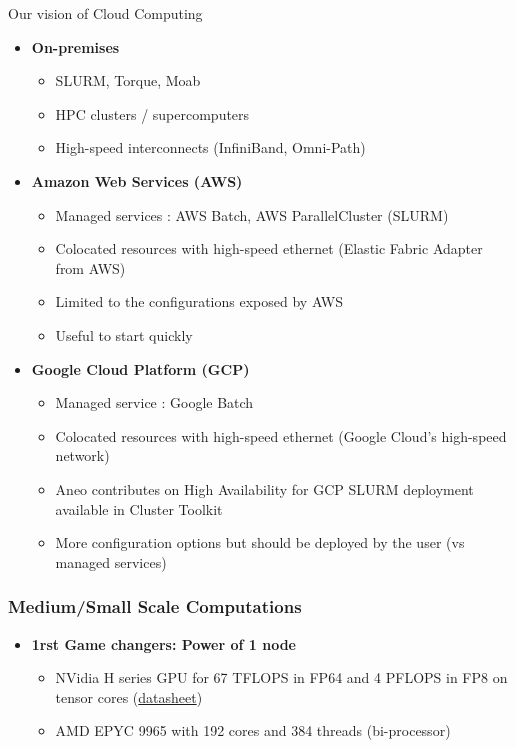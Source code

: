 \documentclass[10pt,aspectratio=1609]{beamer}
\begin{document}
\begin{section}{Our vision of Cloud Computing}
\begin{frame}
  \begin{itemize}
    \item \textbf{On-premises}
    \begin{itemize}
      \item SLURM, Torque, Moab
      \item HPC clusters / supercomputers
      \item High-speed interconnects (InfiniBand, Omni-Path)
    \end{itemize}

    \item \textbf{Amazon Web Services (AWS)}
    \begin{itemize}
      \item Managed services : AWS Batch, AWS ParallelCluster (SLURM)
      \item Colocated resources with high-speed ethernet (Elastic Fabric Adapter from AWS)
      \item Limited to the configurations exposed by AWS
      \item Useful to start quickly
    \end{itemize}

    \item \textbf{Google Cloud Platform (GCP)}
    \begin{itemize}
      \item Managed service : Google Batch
      \item Colocated resources with high-speed ethernet (Google Cloud's high-speed network)
      \item Aneo contributes on High Availability for GCP SLURM deployment available in Cluster Toolkit
      \item More configuration options but should be deployed by the user (vs managed services)
    \end{itemize}
  \end{itemize}
\end{frame}


\begin{frame}
  \frametitle{Medium/Small Scale Computations}

  \begin{itemize}
    \item \textbf{1rst Game changers: Power of 1 node}
    \begin{itemize}
      \item NVidia H series GPU for 67 TFLOPS in FP64 and 4 PFLOPS in FP8 on tensor cores
      (\href{https://nvdam.widen.net/s/nb5zzzsjdf/hpc-datasheet-sc23-h200-datasheet-3002446}{datasheet})
      \item AMD EPYC 9965 with 192 cores and 384 threads (bi-processor)
    \end{itemize}


\end{itemize}
\end{frame}
\end{section}
\end{document}
